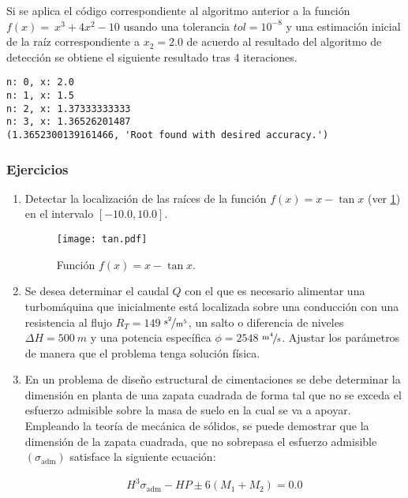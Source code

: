 Si se aplica el código correspondiente al algoritmo anterior a la función $f (x) = \ x^3 + 4x^2 - 10$ usando una tolerancia $tol = 10^{-8}$ y una estimación inicial de la raíz correspondiente a $x_2=2.0$ de acuerdo al resultado del algoritmo de detección se obtiene el siguiente resultado tras 4 iteraciones.
\begin{verbatim}
n: 0, x: 2.0
n: 1, x: 1.5
n: 2, x: 1.37333333333
n: 3, x: 1.36526201487
(1.3652300139161466, 'Root found with desired accuracy.')
\end{verbatim}

\newpage
\subsubsection{Ejercicios}
\begin{enumerate}

\item \label{ejer:raices-tan} Detectar la localización de las raíces de la función $f(x) = x - \tan x$ (ver \cref{fig:tan}) en el intervalo $[-10.0,10.0]$.
\begin{figure}[h]
\centering
\texttt{[image: tan.pdf]}
\caption{Función $f(x) = x - \tan x$.}
\label{fig:tan}
\end{figure}

\item \label{ejer:raices-turbo} Se desea determinar el caudal $Q$ con el que es necesario alimentar una turbomáquina que inicialmente está localizada sobre una conducción con una resistencia al flujo ${R_T} = 149$ $\nicefrac{\unit{s}^2}{\unit{m}^5} $, un salto o diferencia de niveles $\Delta H = 500\ \unit{m}$ y una potencia específica $\phi = 2548$ $\nicefrac{\unit{m}^4}{\unit{s}}$. Ajustar los parámetros de manera que el problema tenga solución física.

\item \label{ejer:raices-zapata} En un problema de diseño estructural de cimentaciones se debe determinar la dimensión en planta de una zapata cuadrada de forma tal que no se exceda el esfuerzo admisible sobre la masa de suelo en la cual se va a apoyar. Empleando la teoría de mecánica de sólidos, se puede demostrar que la dimensión de la zapata cuadrada, que no sobrepasa el esfuerzo admisible $(\sigma_\text{adm})$ satisface la siguiente ecuación:

\begin{align}
	H^3 \sigma_\text{adm} - H P \pm 6 (M_1 + M_2) = 0.0
\end{align}


\end{enumerate}
